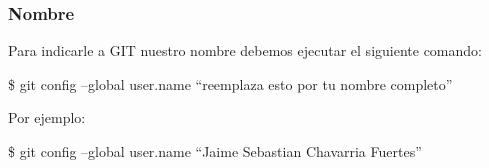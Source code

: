             \subsubsection{Nombre}
                Para indicarle a GIT nuestro nombre debemos ejecutar el siguiente comando:
                    \begin{lstlistings}
                        \$ git config --global user.name ``reemplaza esto por tu nombre completo''
                    \end{lstlistings}
                Por ejemplo:
                    \begin{lstlistings}
                        \$ git config --global user.name ``Jaime Sebastian Chavarria Fuertes''
                    \end{lstlistings}